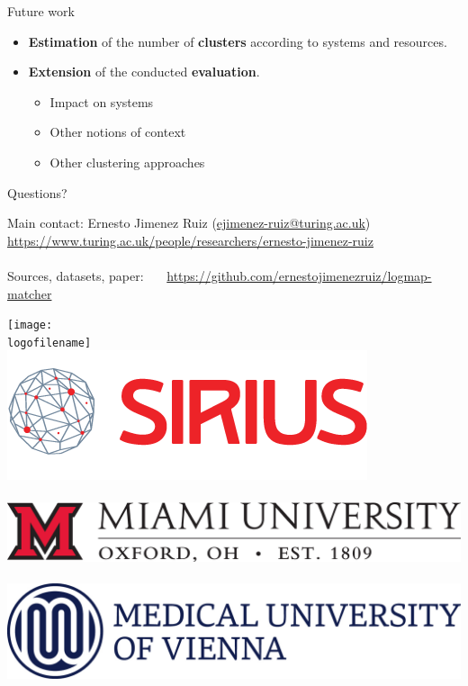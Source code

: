 \documentclass[t]{beamer}
\begin{document}
\begin{frame}{Future work}
  	
  	  \begin{itemize}    
  			\item \textbf{Estimation} of the number of \textbf{clusters} according to
  			systems and resources.
  			\item \textbf{Extension} of the conducted \textbf{evaluation}.
			\begin{itemize}
			  \item Impact on systems
			  \item Other notions of context
			  \item Other clustering approaches 
  			\end{itemize} 
		\end{itemize}
  	
\end{frame}








\begin{frame}{Questions?}
	
	
	Main contact:
	Ernesto Jimenez Ruiz (\url{ejimenez-ruiz@turing.ac.uk})
	\url{https://www.turing.ac.uk/people/researchers/ernesto-jimenez-ruiz}
	\\~\\
	Sources, datasets, paper: 
	~~~\url{https://github.com/ernestojimenezruiz/logmap-matcher}
	
	\vspace{1.1cm}
	
	\texttt{[image: \\logofilename]}~~
	\includegraphics[height=1.4\gridblock]{images/sirius-logo.png}
	\\~~\\
	\includegraphics[height=1.0\gridblock]{images/muo.jpg}~~
	\includegraphics[height=1.2\gridblock]{images/muv.jpg}
		    
	\finalpage 
\end{frame}
\end{document}
